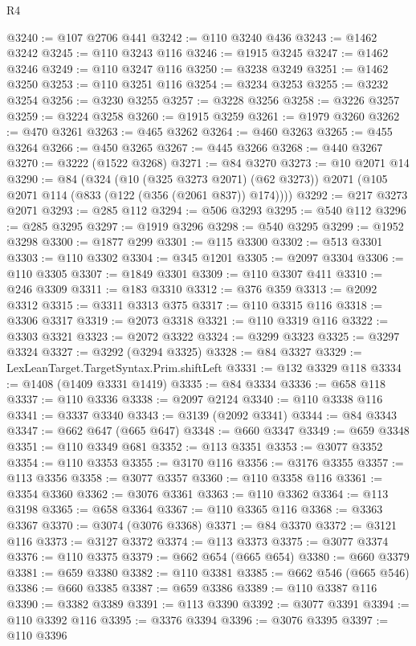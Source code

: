 \begin{lexlean}{R4}
\begin{coremodule}
@3240 := @107 @2706 @441
@3242 := @110 @3240 @436
@3243 := @1462 @3242
@3245 := @110 @3243 @116
@3246 := @1915 @3245
@3247 := @1462 @3246
@3249 := @110 @3247 @116
@3250 := @3238 @3249
@3251 := @1462 @3250
@3253 := @110 @3251 @116
@3254 := @3234 @3253
@3255 := @3232 @3254
@3256 := @3230 @3255
@3257 := @3228 @3256
@3258 := @3226 @3257
@3259 := @3224 @3258
@3260 := @1915 @3259
@3261 := @1979 @3260
@3262 := @470 @3261
@3263 := @465 @3262
@3264 := @460 @3263
@3265 := @455 @3264
@3266 := @450 @3265
@3267 := @445 @3266
@3268 := @440 @3267
@3270 := @3222 (@1522 @3268)
@3271 := @84 @3270
@3273 := @10 @2071 @14
@3290 := @84
    (@324
      (@10 (@325 @3273 @2071) (@62 @3273))
      @2071
      (@105 @2071 @114 (@833 (@122 (@356 (@2061 @837)) @174))))
@3292 := @217 @3273 @2071
@3293 := @285 @112
@3294 := @506 @3293
@3295 := @540 @112
@3296 := @285 @3295
@3297 := @1919 @3296
@3298 := @540 @3295
@3299 := @1952 @3298
@3300 := @1877 @299
@3301 := @115 @3300
@3302 := @513 @3301
@3303 := @110 @3302
@3304 := @345 @1201
@3305 := @2097 @3304
@3306 := @110 @3305
@3307 := @1849 @3301
@3309 := @110 @3307 @411
@3310 := @246 @3309
@3311 := @183 @3310
@3312 := @376 @359
@3313 := @2092 @3312
@3315 := @3311 @3313 @375
@3317 := @110 @3315 @116
@3318 := @3306 @3317
@3319 := @2073 @3318
@3321 := @110 @3319 @116
@3322 := @3303 @3321
@3323 := @2072 @3322
@3324 := @3299 @3323
@3325 := @3297 @3324
@3327 := @3292 (@3294 @3325)
@3328 := @84 @3327
@3329 := LexLeanTarget.TargetSyntax.Prim.shiftLeft
@3331 := @132 @3329 @118
@3334 := @1408 (@1409 @3331 @1419)
@3335 := @84 @3334
@3336 := @658 @118
@3337 := @110 @3336
@3338 := @2097 @2124
@3340 := @110 @3338 @116
@3341 := @3337 @3340
@3343 := @3139 (@2092 @3341)
@3344 := @84 @3343
@3347 := @662 @647 (@665 @647)
@3348 := @660 @3347
@3349 := @659 @3348
@3351 := @110 @3349 @681
@3352 := @113 @3351
@3353 := @3077 @3352
@3354 := @110 @3353
@3355 := @3170 @116
@3356 := @3176 @3355
@3357 := @113 @3356
@3358 := @3077 @3357
@3360 := @110 @3358 @116
@3361 := @3354 @3360
@3362 := @3076 @3361
@3363 := @110 @3362
@3364 := @113 @3198
@3365 := @658 @3364
@3367 := @110 @3365 @116
@3368 := @3363 @3367
@3370 := @3074 (@3076 @3368)
@3371 := @84 @3370
@3372 := @3121 @116
@3373 := @3127 @3372
@3374 := @113 @3373
@3375 := @3077 @3374
@3376 := @110 @3375
@3379 := @662 @654 (@665 @654)
@3380 := @660 @3379
@3381 := @659 @3380
@3382 := @110 @3381
@3385 := @662 @546 (@665 @546)
@3386 := @660 @3385
@3387 := @659 @3386
@3389 := @110 @3387 @116
@3390 := @3382 @3389
@3391 := @113 @3390
@3392 := @3077 @3391
@3394 := @110 @3392 @116
@3395 := @3376 @3394
@3396 := @3076 @3395
@3397 := @110 @3396

\end{coremodule}
\end{lexlean}
